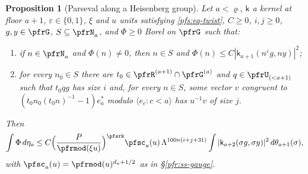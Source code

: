 \documentclass[10pt]{amsart}
\newtheorem{proposition}[theorem]{Proposition}
\theoremstyle{definition}
\theoremstyle{remark}
\begin{document}
\begin{proposition}[Parseval along a Heisenberg group]\label{pfs:parseval}
Let $a<\varrho$, $\mathsf k$ a kernel at floor $a+1$, $\varepsilon\in\{0,1\}$, $\xi$ and $u$ units satisfying
\eqref{pfs:eq-twist}, $C\ge0$, $i,j\ge0$, $g,y\in\pfrG$, $S\subseteq\pfrN_a$, and $\Phi\ge0$ Borel on $\pfrG$ such
that:
\begin{enumerate}
\item[(a)] if $n\in\pfrN_a$ and $\Phi(n)\ne0$, then $n\in S$ and $\Phi(n)\le C|\mathsf k_{a+1}(n^\varepsilon g,ny)|^2$;
\item[(b)] for every $n_0\in S$ there are $t_0\in\pfrR^{(a+1)}\cap\pfrG^{(a)}$ and $q\in\pfrU_{(<a+1)}$ such that
$t_0qg$ has size $i$ and, for every $n\in S$, some vector $v$ congruent to $(t_0n_0(t_0n)^{-1}-1)e_a^*$ modulo
$\langle e_c:c<a\rangle$ has $u^{-1}v$ of size $j$.
\end{enumerate}
Then
\[
\int\Phi\,d\eta_a\le C\Bigl(\frac P{\pfrmod(\xi u)}\Bigr)^{\pfsrk}\pfsc_a(u)\,\Lambda^{100n(i+j+31)}
\int|\mathsf k_{a+2}(\sigma g,\sigma y)|^2\,d\theta_{a+1}(\sigma),
\]
with $\pfsc_a(u)=\pfrmod(u)^{d_a+1/2}$ as in \S\ref{pfr:ss-gauge}.
\end{proposition}
\end{document}
